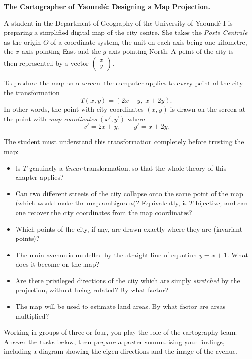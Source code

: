 \documentclass[11pt]{article}
\newcounter{popsec}
\newcounter{popsub}
\newcommand{\courssub}[1]{%
  \stepcounter{popsub}%
  \par\vspace{9pt}\noindent{\popxbold\fontsize{11.5}{13}\selectfont\color{popink}{\color{poporange}\thepopsec.\thepopsub}\hspace{6pt}#1}\par\nopagebreak\vspace{4pt}
}
\begin{document}
\courssub{Situation}

\textbf{The Cartographer of Yaoundé: Designing a Map Projection.}\par

A student in the Department of Geography of the University of Yaoundé I is preparing a simplified digital map of the city centre. She takes the \emph{Poste Centrale} as the origin $O$ of a coordinate system, the unit on each axis being one kilometre, the $x$-axis pointing East and the $y$-axis pointing North. A point of the city is then represented by a vector $\begin{pmatrix} x \\ y \end{pmatrix}$.

To produce the map on a screen, the computer applies to every point of the city the transformation
\[ T(x,y) = (2x+y,\; x+2y). \]
In other words, the point with city coordinates $(x,y)$ is drawn on the screen at the point with \emph{map coordinates} $(x',y')$ where
\[ x' = 2x+y, \qquad y' = x+2y. \]

The student must understand this transformation completely before trusting the map:

\begin{itemize}
\item Is $T$ genuinely a \emph{linear} transformation, so that the whole theory of this chapter applies?
\item Can two different streets of the city collapse onto the same point of the map (which would make the map ambiguous)? Equivalently, is $T$ bijective, and can one recover the city coordinates from the map coordinates?
\item Which points of the city, if any, are drawn exactly where they are (invariant points)?
\item The main avenue is modelled by the straight line of equation $y=x+1$. What does it become on the map?
\item Are there privileged directions of the city which are simply \emph{stretched} by the projection, without being rotated? By what factor?
\item The map will be used to estimate land areas. By what factor are areas multiplied?
\end{itemize}

Working in groups of three or four, you play the role of the cartography team. Answer the tasks below, then prepare a poster summarising your findings, including a diagram showing the eigen-directions and the image of the avenue.
\end{document}
